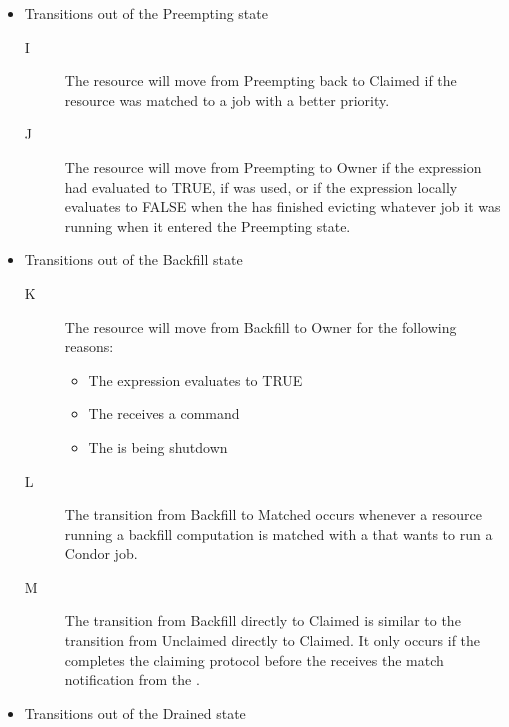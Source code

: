 \begin{itemize}
\begin{description}
\end{description}


\item Transitions out of the Preempting state

\begin{description}

\item[I] The resource will move from Preempting back to Claimed if the
  resource was matched to a job with a better priority.

\item[J] The resource will move from Preempting to Owner if the
   expression had evaluated to TRUE, if 
  was used, or if the  expression locally evaluates to
  FALSE when the  has finished evicting whatever job it
  was running when it entered the Preempting state.

\end{description}


\item Transitions out of the Backfill state

\begin{description}

\item[K] The resource will move from Backfill to Owner for the
  following reasons:
  \begin{itemize}
  \item The  expression evaluates to TRUE
  \item The  receives a  command
  \item The  is being shutdown
  \end{itemize}
 
\item[L] The transition from Backfill to Matched occurs whenever a
  resource running a backfill computation is matched with a
   that wants to run a Condor job.

\item[M] The transition from Backfill directly to Claimed is similar
  to the transition from Unclaimed directly to Claimed.
  It only occurs if the  completes the claiming
  protocol before the  receives the match notification
  from the .

\end{description}

\item Transitions out of the Drained state


\end{itemize}
